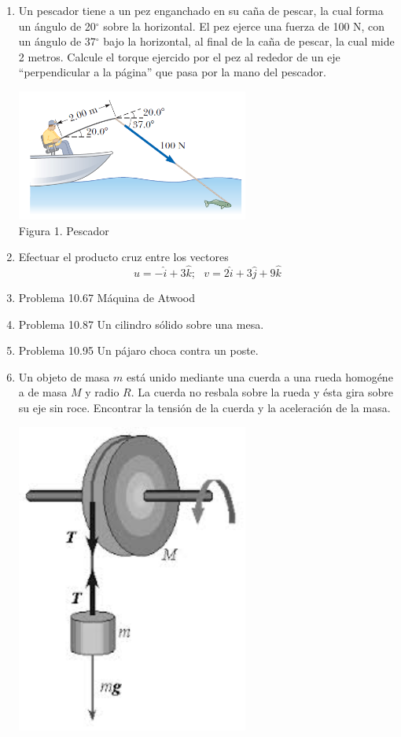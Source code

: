\documentclass[letterpaper,10pt,onecolumn]{article}
\begin{document}
\begin{enumerate}

\item Un pescador tiene a un pez enganchado en su caña de pescar, la cual forma un ángulo de 20$^\circ$ sobre la horizontal. El pez ejerce una fuerza de 100 N, con un ángulo de 37$^\circ$ bajo la horizontal, al final de la caña de pescar, la cual mide 2 metros. Calcule el torque ejercido por el pez al rededor de un eje ``perpendicular a la página'' que pasa por la mano del pescador.
\begin{center}
\includegraphics[width=0.6\textwidth]{pez.png}\\
Figura 1. Pescador
\end{center} %
\item Efectuar el producto cruz entre los vectores
\begin{equation}
u=-\hat{i}+3\hat{k};~ ~~v=2\hat{i}+3\hat{j}+ 9 \hat{k}  
\end{equation} 
\item Problema 10.67 Máquina de Atwood %
\item Problema 10.87 Un cilindro sólido sobre una mesa. %
\item Problema 10.95 Un pájaro choca contra un poste. %
\item Un objeto de masa  $m$  está unido mediante una cuerda a una rueda homogéne a de masa  $M$  y radio  $R$. La cuerda no resbala sobre la rueda y ésta gira sobre su eje sin roce. Encontrar la tensión de la cuerda y la aceleración de la masa.
 \begin{center}
\includegraphics[width=0.6\textwidth]{torque.jpeg}\\

\end{center}
\end{enumerate}
\end{document}
